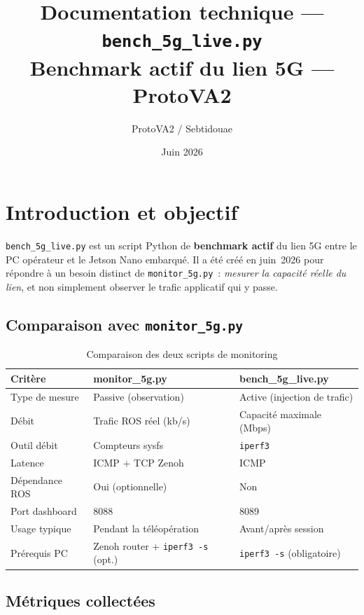 \documentclass[a4paper,12pt]{article}
\title{\textbf{Documentation technique — \texttt{bench\_5g\_live.py}}\\
       \large Benchmark actif du lien 5G — ProtoVA2}
\author{ProtoVA2 / Sebtidouae}
\date{Juin 2026}
\begin{document}
\maketitle
\tableofcontents
\newpage

\section{Introduction et objectif}

\texttt{bench\_5g\_live.py} est un script Python de \textbf{benchmark actif} du lien 5G
entre le PC opérateur et le Jetson Nano embarqué. Il a été créé en juin~2026 pour
répondre à un besoin distinct de \texttt{monitor\_5g.py}~: \emph{mesurer la capacité réelle
du lien}, et non simplement observer le trafic applicatif qui y passe.

\subsection{Comparaison avec \texttt{monitor\_5g.py}}

\begin{table}[H]
\centering
\begin{tabular}{lll}
\toprule
\textbf{Critère} & \textbf{monitor\_5g.py} & \textbf{bench\_5g\_live.py} \\
\midrule
Type de mesure      & Passive (observation) & Active (injection de trafic) \\
Débit               & Trafic ROS réel (kb/s) & Capacité maximale (Mbps) \\
Outil débit         & Compteurs sysfs & \texttt{iperf3} \\
Latence             & ICMP + TCP Zenoh & ICMP \\
Dépendance ROS      & Oui (optionnelle) & Non \\
Port dashboard      & 8088 & 8089 \\
Usage typique       & Pendant la téléopération & Avant/après session \\
Prérequis PC        & Zenoh router + \texttt{iperf3 -s} (opt.) & \texttt{iperf3 -s} (obligatoire) \\
\bottomrule
\end{tabular}
\caption{Comparaison des deux scripts de monitoring}
\end{table}

\subsection{Métriques collectées}
\end{document}
